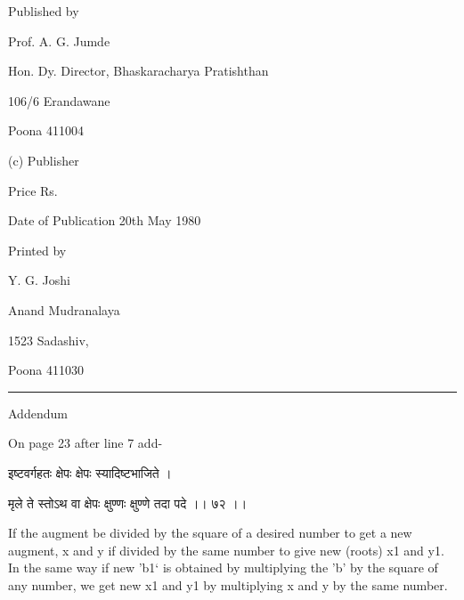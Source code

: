 \documentclass[]{article}
\date{}
\begin{document}
{Published by}

{Prof. A. G. Jumde}

{Hon. Dy. Director, Bhaskaracharya Pratishthan}

{106/6 Erandawane}

{Poona 411004}

{(c) Publisher}

{Price Rs.}

{Date of Publication 20th May 1980}

{Printed by }

{Y. G. Joshi}

{Anand Mudranalaya}

{1523 Sadashiv,}

{Poona 411030}

\begin{center}\rule{0.5\linewidth}{\linethickness}\end{center}

{Addendum}

{On page 23 after line 7 add-}

{इष्टवर्गहतः क्षेपः क्षेपः स्यादिष्टभाजिते । }

{मृले ते स्तोऽथ वा क्षेपः क्षुण्णः क्षुण्णे तदा पदे ।। ७२ ।। }

{If the augment be divided by the square of a desired number to get a
new augment, x and y if divided by the same number to give new (roots)
x}{1}{ and y}{1}{. In the same way if new 'b}{1}{` is obtained by
multiplying the 'b' by the square of any number, we get new x}{1}{ and
y}{1}{ by multiplying x and y by the same number.\\
}
\end{document}
